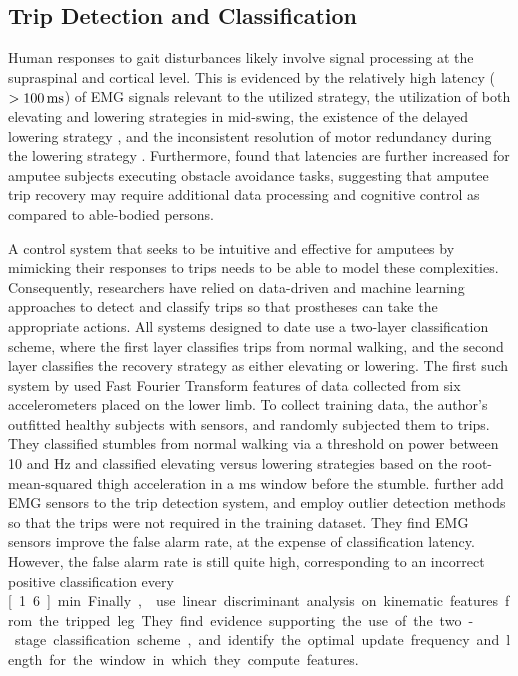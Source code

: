 \subsection{Trip Detection and Classification}
Human responses to gait disturbances likely involve signal processing at the
supraspinal and cortical level. This is evidenced by the relatively high latency
($>\unit[100]{ms}$) of EMG signals relevant to the utilized strategy, the
utilization of both elevating and lowering strategies in mid-swing, the
existence of the delayed lowering strategy \citep{schillings2000muscular}, and
the inconsistent resolution of motor redundancy during the lowering strategy
\citep{eng1994strategies}. Furthermore, \citet{hofstad2009evidence} found that
latencies are further increased for amputee subjects executing obstacle
avoidance tasks, suggesting that amputee trip recovery may require additional
data processing and cognitive control as compared to able-bodied persons. 

A control system that seeks to be intuitive and effective for amputees by
mimicking their responses to trips needs to be able to model these complexities.
Consequently, researchers have relied on data-driven and machine learning
approaches to detect and classify trips so that prostheses can take the
appropriate actions. All systems designed to date use a two-layer classification
scheme, where the first layer classifies trips from normal walking, and the
second layer classifies the recovery strategy as either elevating or lowering.
The first such system by \citet{lawson2010stumble} used Fast Fourier Transform
features of data collected from six accelerometers placed on the lower limb. To
collect training data, the author's outfitted healthy subjects with sensors, and
randomly subjected them to trips. They classified stumbles from normal walking
via a threshold on power between 10 and \unit[40]{Hz} and classified elevating
versus lowering strategies based on the root-mean-squared thigh acceleration in
a \unit[50]{ms} window before the stumble. \citet{zhang2011towards} further add
EMG sensors to the trip detection system, and employ outlier detection methods
so that the trips were not required in the training dataset. They find EMG sensors
improve the false alarm rate, at the expense of classification latency. However,
the false alarm rate is still quite high, corresponding to an incorrect positive
classification every \unit[1.6]{min}. Finally, \citet{shirota2014recovery} use
linear discriminant analysis on kinematic features from the tripped leg. They
find evidence supporting the use of the two-stage classification scheme, and
identify the optimal update frequency and length for the window in which they
compute features.

